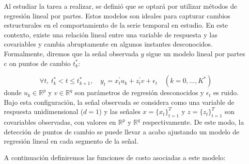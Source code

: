\documentclass{article}[14pts]
\begin{document}
    Al estudiar la tarea a realizar, se definió que se optará por utilizar métodos de regresión lineal por partes. Estos modelos son ideales para capturar cambios estructurales en el comportamiento de la serie temporal en estudio. En este contexto, existe una relación lineal entre una variable de respuesta y las covariables y cambia abruptamente en algunos instantes desconocidos. Formalmente, diremos que la señal observada $y$ sigue un modelo lineal por partes c on puntos de cambio $t_{k}^{*}$:

      \begin{equation}
        \forall t, \ t_{k}^{*} < t \leq t_{k+1}^{*}, \quad y_{t}= x_{t}^{'}u_{k} + z_{t}^{'}v + \epsilon_{t} \quad (k= 0, \dots, K^{*})
      \end{equation}
    donde $u_{k} \in \mathbb{R}^{p}$ y $v \in \mathbb{R}^{q}$ son parámetros de regresión desconocidos y $\epsilon_{t}$ es ruido. Bajo esta configuración, la señal observada se considera como una variable de respuesta unidimensional ($d=1$) y las señales $x= \{x_{t}\}_{t=1}^{T}$ y $z= \{z_{t}\}_{t=1}^{T}$ son covariables observadas, con valores en $\mathbb{R}^{p}$ y $\mathbb{R}^{q}$ respectivamente. De este modo, la detección de puntos de cambio se puede llevar a acabo ajustando un modelo de regresión lineal en cada segmento de la señal. 

    A continuación definiremos las funciones de costo asociadas a este modelo:
\end{document}
